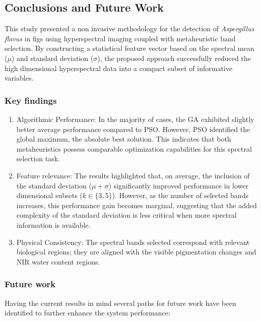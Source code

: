 \documentclass[ASNA,twocolumn]{USG}
\begin{document}
\subsection{Conclusions and Future Work}
This study presented a non invasive methodology for the detection of \textit{Aspergillus flavus} in figs using hyperspectral imaging coupled with metaheuristic band selection. 
By constructing a statistical feature vector based on the spectral mean ($\mu$) and standard deviation ($\sigma$), the proposed approach successfully reduced the high dimensional hyperspectral data into a compact subset of informative variables.

\subsubsection{Key findings}
\begin{enumerate}
    \item Algorithmic Performance: In the majority of cases, the GA exhibited slightly better average performance compared to PSO. However, PSO identified the global maximum, the absolute best solution. This indicates that both metaheuristics possess comparable optimization capabilities for this spectral selection task.
    \item Feature relevance: The results highlighted that, on average, the inclusion of the standard deviation ($\mu+\sigma$) significantly improved performance in lower dimensional subsets ($k\in\{3,5\}$). However, as the number of selected bands increases, this performance gain becomes marginal, suggesting that the added complexity of the standard deviation is less critical when more spectral information is available.
    \item Physical Consistency: The spectral bands selected correspond with relevant biological regions; they are aligned with the visible pigmentation changes and NIR water content regions. 
\end{enumerate}

\subsubsection{Future work}
Having the current results in mind several paths for future work have been identified to further enhance the system performance:
\end{document}
